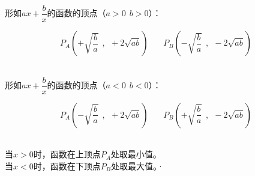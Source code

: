 \documentclass[UTF8]{ctexart}
\begin{document}
    形如$ax+\dfrac{b}{x}$的函数的顶点（$a>0~~b>0$）：
    \begin{large}
        \begin{equation*}
                P_A\left(+\sqrt{\frac{b}{a}}~~,~~+2\sqrt{ab}\right)~~~~~~~~P_B\left(-\sqrt{\frac{b}{a}}~~,~~-2\sqrt{ab}\right)
        \end{equation*}
    \end{large}\\
    形如$ax+\dfrac{b}{x}$的函数的顶点（$a<0~~b<0$）：
    \begin{large}
        \begin{equation*}
                P_A\left(-\sqrt{\frac{b}{a}}~~,~~+2\sqrt{ab}\right)~~~~~~~~P_B\left(+\sqrt{\frac{b}{a}}~~,~~-2\sqrt{ab}\right)
        \end{equation*}
    \end{large}\\
    当$x>0$时，函数在上顶点$P_A$处取最小值。\\[3mm]
    当$x<0$时，函数在下顶点$P_B$处取最大值。·

\newpage
\end{document}

